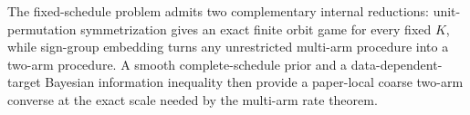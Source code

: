 The fixed-schedule problem admits two complementary internal reductions: unit-permutation symmetrization gives an exact finite orbit game for every fixed \(K\), while sign-group embedding turns any unrestricted multi-arm procedure into a two-arm procedure. A smooth complete-schedule prior and a data-dependent-target Bayesian information inequality then provide a paper-local coarse two-arm converse at the exact scale needed by the multi-arm rate theorem.